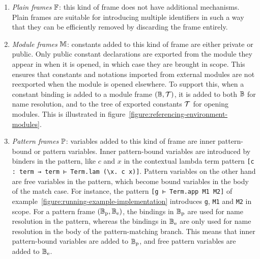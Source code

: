 \begin{enumerate}
\item
\textit{Plain frames} $\mathbb{F}$: this kind of frame does not have additional mechanisms.
Plain frames are suitable for introducing multiple identifiers in such a way that they can be efficiently removed by discarding the frame entirely.
\item
\textit{Module frames} $\mathbb{M}$: constants added to this kind of frame are either private or public.
Only public constant declarations are exported from the module they appear in when it is opened, in which case they are brought in scope.
This ensures that constants and notations imported from external modules are not reexported when the module is opened elsewhere.
To support this, when a constant binding is added to a module frame $(\mathbb{B}, \mathcal{T})$, it is added to both $\mathbb{B}$ for name resolution, and to the tree of exported constants $\mathcal{T}$ for opening modules.
This is illustrated in figure~\ref{figure:referencing-environment-modules}.
\item
\textit{Pattern frames} $\mathbb{P}$: variables added to this kind of frame are inner pattern-bound or pattern variables.
Inner pattern-bound variables are introduced by binders in the pattern, like $c$ and $x$ in the contextual lambda term pattern \verb|[c : term → term ⊢ Term.lam (\x. c x)]|.
Pattern variables on the other hand are free variables in the pattern, which become bound variables in the body of the match case.
For instance, the pattern \verb|[g ⊢ Term.app M1 M2]| of example~\ref{figure:running-example-implementation} introduces \verb|g|, \verb|M1| and \verb|M2| in scope.
For a pattern frame $(\mathbb{B}_{\text{p}}, \mathbb{B}_{\text{e}})$, the bindings in $\mathbb{B}_{\text{p}}$ are used for name resolution in the pattern, whereas the bindings in $\mathbb{B}_{\text{e}}$ are only used for name resolution in the body of the pattern-matching branch.
This means that inner pattern-bound variables are added to $\mathbb{B}_{\text{p}}$, and free pattern variables are added to $\mathbb{B}_{\text{e}}$.
\end{enumerate}

